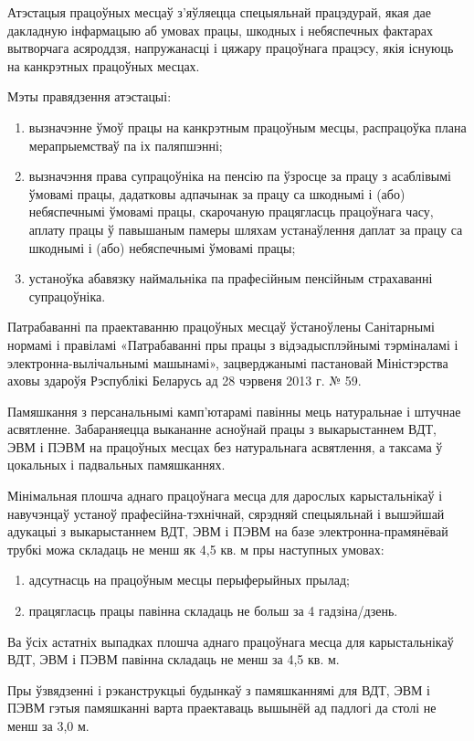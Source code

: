 Атэстацыя працоўных месцаў з'яўляецца спецыяльнай працэдурай, якая дае дакладную інфармацыю аб умовах працы, шкодных і небяспечных фактарах вытворчага асяроддзя, напружанасці і цяжару працоўнага працэсу, якія існуюць на канкрэтных працоўных месцах.

Мэты правядзення атэстацыі:
\begin{enumerate}
    \item вызначэнне ўмоў працы на канкрэтным працоўным месцы, распрацоўка плана мерапрыемстваў па іх паляпшэнні;
    \item вызначэння права супрацоўніка на пенсію па ўзросце за працу з асаблівымі ўмовамі працы, дадатковы адпачынак за працу са шкоднымі і (або) небяспечнымі ўмовамі працы, скарочаную працягласць працоўнага часу, аплату працы ў павышаным памеры шляхам устанаўлення даплат за працу са шкоднымі і (або) небяспечнымі ўмовамі працы;
    \item устаноўка абавязку наймальніка па прафесійным пенсійным страхаванні супрацоўніка.
\end{enumerate}

Патрабаванні па праектаванню працоўных месцаў ўстаноўлены Санітарнымі нормамі і правіламі «Патрабаванні пры працы з відэадысплэйнымі тэрміналамі і электронна-вылічальнымі машынамі», зацверджанымі пастановай Міністэрства аховы здароўя Рэспублікі Беларусь ад 28 чэрвеня 2013 г. № 59.

Памяшкання з персанальнымі камп'ютарамі павінны мець натуральнае і штучнае асвятленне. Забараняецца выкананне асноўнай працы з выкарыстаннем ВДТ, ЭВМ і ПЭВМ на працоўных месцах без натуральнага асвятлення, а таксама ў цокальных і падвальных памяшканнях.

Мінімальная плошча аднаго працоўнага месца для дарослых карыстальнікаў і навучэнцаў устаноў прафесійна-тэхнічнай, сярэдняй спецыяльнай і вышэйшай адукацыі з выкарыстаннем ВДТ, ЭВМ і ПЭВМ на базе электронна-прамянёвай трубкі можа складаць не менш як 4,5 кв. м пры наступных умовах:
\begin{enumerate}
    \item адсутнасць на працоўным месцы перыферыйных прылад;
    \item працягласць працы павінна складаць не больш за 4 гадзіна/дзень.
\end{enumerate}

Ва ўсіх астатніх выпадках плошча аднаго працоўнага месца для карыстальнікаў ВДТ, ЭВМ і ПЭВМ павінна складаць не менш за 4,5 кв. м.

Пры ўзвядзенні і рэканструкцыі будынкаў з памяшканнямі для ВДТ, ЭВМ і ПЭВМ гэтыя памяшканні варта праектаваць вышынёй ад падлогі да столі не менш за 3,0 м.

